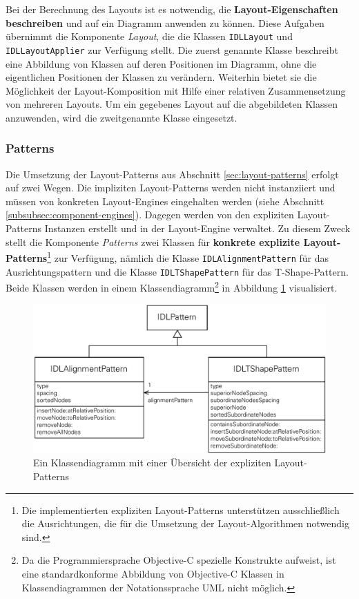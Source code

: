 Bei der Berechnung des Layouts ist es notwendig, die \textbf{Layout-Eigenschaften beschreiben} und auf ein Diagramm anwenden zu können. Diese Aufgaben übernimmt die Komponente \textit{Layout}, die die Klassen \texttt{IDLLayout} und \texttt{IDLLayoutApplier} zur Verfügung stellt. Die zuerst genannte Klasse beschreibt eine Abbildung von Klassen auf deren Positionen im Diagramm, ohne die eigentlichen Positionen der Klassen zu verändern. Weiterhin bietet sie die Möglichkeit der Layout-Komposition mit Hilfe einer relativen Zusammensetzung von mehreren Layouts. Um ein gegebenes Layout auf die abgebildeten Klassen anzuwenden, wird die zweitgenannte Klasse eingesetzt.

\subsubsection{Patterns}
\label{subsubsec:patterns}

Die Umsetzung der Layout-Patterns aus Abschnitt \ref{sec:layout-patterns} erfolgt auf zwei Wegen. Die impliziten Layout-Patterns werden nicht instanziiert und müssen von konkreten Layout-Engines eingehalten werden (siehe Abschnitt \ref{subsubsec:component-engines}). Dagegen werden von den expliziten Layout-Patterns Instanzen erstellt und in der Layout-Engine verwaltet. Zu diesem Zweck stellt die Komponente \textit{Patterns} zwei Klassen für \textbf{konkrete explizite Layout-Patterns}\footnote{Die implementierten expliziten Layout-Patterns unterstützen ausschließlich die Ausrichtungen, die für die Umsetzung der Layout-Algorithmen notwendig sind.} zur Verfügung, nämlich die Klasse \texttt{IDLAlignment\-Pat\-tern} für das Ausrichtungspattern und die Klasse \texttt{IDLTShapePattern} für das T-Shape-Pattern. Beide Klassen werden in einem Klassendiagramm\footnote{Da die Programmiersprache Objective-C spezielle Konstrukte aufweist, ist eine standardkonforme Abbildung von Objective-C Klassen in Klassendiagrammen der Notationssprache UML nicht möglich.} in Abbildung \ref{fig:layout-patterns-implementation} visualisiert.

\begin{figure}[hbt]
    \centering
    \includegraphics[scale=0.8]{assets/layout-patterns-implementation}
    \caption{Ein Klassendiagramm mit einer Übersicht der expliziten Layout-Patterns}
    \label{fig:layout-patterns-implementation}
\end{figure}

